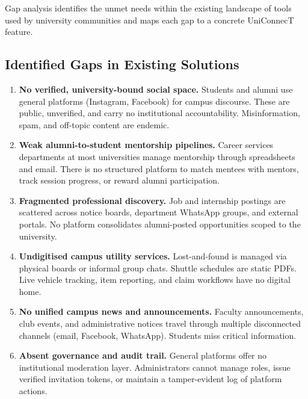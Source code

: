 \documentclass[12pt, a4paper]{article}
\begin{document}
Gap analysis identifies the unmet needs within the existing landscape of tools used
by university communities and maps each gap to a concrete UniConnecT feature.

\subsection{Identified Gaps in Existing Solutions}

\begin{enumerate}

    \item \textbf{No verified, university-bound social space.} Students and alumni use
    general platforms (Instagram, Facebook) for campus discourse. These are public,
    unverified, and carry no institutional accountability. Misinformation, spam, and
    off-topic content are endemic.

    \item \textbf{Weak alumni-to-student mentorship pipelines.} Career services
    departments at most universities manage mentorship through spreadsheets and email.
    There is no structured platform to match mentees with mentors, track session
    progress, or reward alumni participation.

    \item \textbf{Fragmented professional discovery.} Job and internship postings are
    scattered across notice boards, department WhatsApp groups, and external portals.
    No platform consolidates alumni-posted opportunities scoped to the university.

    \item \textbf{Undigitised campus utility services.} Lost-and-found is managed via
    physical boards or informal group chats. Shuttle schedules are static PDFs. Live
    vehicle tracking, item reporting, and claim workflows have no digital home.

    \item \textbf{No unified campus news and announcements.} Faculty announcements,
    club events, and administrative notices travel through multiple disconnected
    channels (email, Facebook, WhatsApp). Students miss critical information.

    \item \textbf{Absent governance and audit trail.} General platforms offer no
    institutional moderation layer. Administrators cannot manage roles, issue verified
    invitation tokens, or maintain a tamper-evident log of platform actions.

\end{enumerate}
\end{document}
